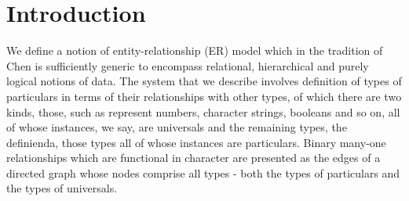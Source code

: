  \section{Introduction}

We  define a notion of entity-relationship (ER) model which in the tradition of Chen\cite{Chen1976} is sufficiently generic to encompass relational, hierarchical and purely logical  notions of data.
The system that we describe involves definition of types of particulars in terms of their relationships with other types, of which there are two kinds, those, such as represent numbers, character strings, booleans and so on, all of whose instances, we say, are universals and the remaining types, the definienda, those types all of whose instances are particulars. Binary many-one relationships which are functional in character are presented as the edges of a directed graph whose nodes comprise all types - both the types of particulars and the types of universals. 


